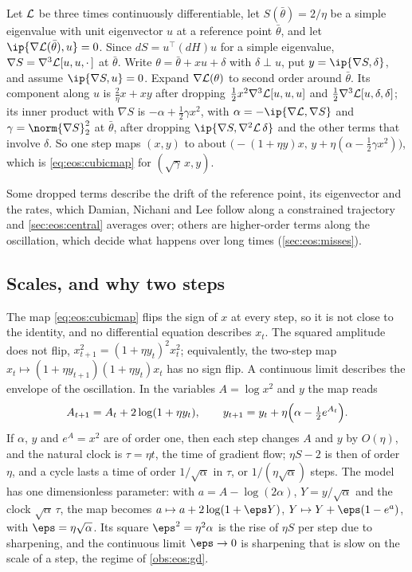 \begin{refsection}
\begin{heuristic}
Let $\mathcal{L}$ be three times continuously differentiable, let $S(\bar\theta)=2/\eta$ be a simple eigenvalue with unit eigenvector $u$ at a reference point $\bar\theta$, and let $\ip{\nabla\Loss(\bar\theta),u}=0$. Since $dS=u^\top(dH)u$ for a simple eigenvalue, $\nabla S=\nabla^3\mathcal{L}[u,u,\cdot\,]$ at $\bar\theta$. Write $\theta=\bar\theta+xu+\delta$ with $\delta\perp u$, put $y=\ip{\nabla S,\delta}$, and assume $\ip{\nabla S,u}=0$. Expand $\nabla\mathcal{L}(\theta)$ to second order around $\bar\theta$. Its component along $u$ is $\frac2\eta x+xy$ after dropping $\frac12x^2\nabla^3\mathcal{L}[u,u,u]$ and $\frac12\nabla^3\mathcal{L}[u,\delta,\delta]$; its inner product with $\nabla S$ is $-\alpha+\frac12\gamma x^2$, with $\alpha=-\ip{\nabla\Loss,\nabla S}$ and $\gamma=\norm{\nabla S}_2^2$ at $\bar\theta$, after dropping $\ip{\nabla S,\nabla^2\Loss\,\delta}$ and the other terms that involve $\delta$. So one step maps $(x,y)$ to about $\bigl(-(1+\eta y)x,\,y+\eta(\alpha-\frac12\gamma x^2)\bigr)$, which is \eqref{eq:eos:cubicmap} for $(\sqrt\gamma\,x,y)$.
\end{heuristic}

Some dropped terms describe the drift of the reference point, its eigenvector and the rates, which Damian, Nichani and Lee follow along a constrained trajectory and \cref{sec:eos:central} averages over; others are higher-order terms along the oscillation, which decide what happens over long times (\cref{sec:eos:misses}).

\subsection{Scales, and why two steps}

The map \eqref{eq:eos:cubicmap} flips the sign of $x$ at every step, so it is not close to the identity, and no differential equation describes $x_t$. The squared amplitude does not flip, $x_{t+1}^2=(1+\eta y_t)^2x_t^2$; equivalently, the two-step map $x_t\mapsto(1+\eta y_{t+1})(1+\eta y_t)x_t$ has no sign flip. A continuous limit describes the envelope of the oscillation. In the variables $A=\log x^2$ and $y$ the map reads
\begin{equation}\label{eq:eos:Amap}
  A_{t+1}=A_t+2\log(1+\eta y_t),\qquad y_{t+1}=y_t+\eta\Bigl(\alpha-\tfrac12e^{A_t}\Bigr).
\end{equation}
If $\alpha$, $y$ and $e^A=x^2$ are of order one, then each step changes $A$ and $y$ by $O(\eta)$, and the natural clock is $\tau=\eta t$, the time of gradient flow; $\eta S-2$ is then of order $\eta$, and a cycle lasts a time of order $1/\sqrt\alpha$ in $\tau$, or $1/(\eta\sqrt\alpha)$ steps. The model has one dimensionless parameter: with $a=A-\log(2\alpha)$, $Y=y/\sqrt\alpha$ and the clock $\sqrt\alpha\,\tau$, the map becomes $a\mapsto a+2\log(1+\eps Y)$, $Y\mapsto Y+\eps(1-e^a)$, with $\eps=\eta\sqrt\alpha$. Its square $\eps^2=\eta^2\alpha$ is the rise of $\eta S$ per step due to sharpening, and the continuous limit $\eps\to0$ is sharpening that is slow on the scale of a step, the regime of \cref{obs:eos:gd}.


\end{refsection}
